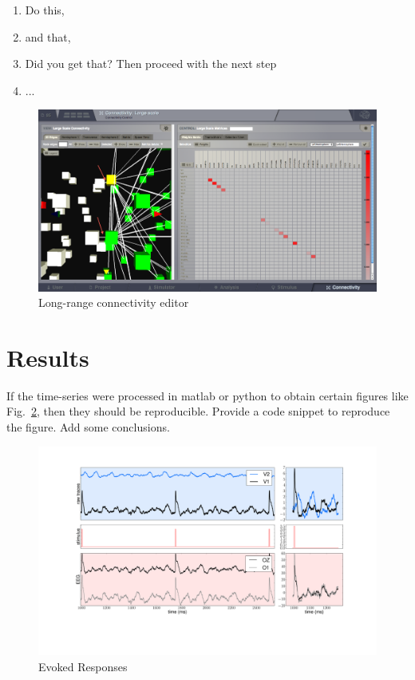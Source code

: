 \documentclass{tufte-handout}
\begin{document}
\begin{enumerate}
\item Do this,
\item and that,
\item Did you get that? Then proceed with the next step
\item ...
\end{enumerate}



\begin{figure}[h]
  \includegraphics[width=\linewidth]{steps_Connectivity_ShowConnections.png}%
  \caption{Long-range connectivity editor}%
  \label{fig:fig}%
\end{figure}


\section{Results}\label{sec:results}

If the time-series were processed in matlab or python to obtain certain
figures like Fig.~\ref{fig:fig_results}, then they should be reproducible.
Provide a code snippet to reproduce the figure. Add some conclusions.

\begin{figure}[h]
  \includegraphics[width=\linewidth]{results_Example_ER_stochastic.pdf}%
  \caption{Evoked Responses}%
  \label{fig:fig_results}%
\end{figure}
\end{document}
